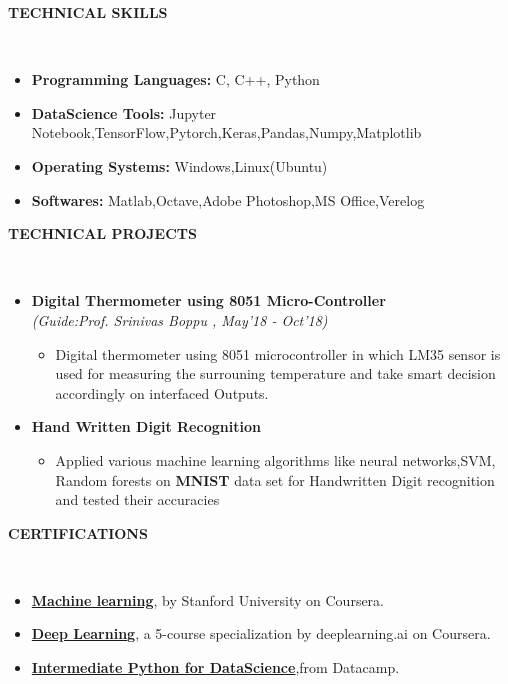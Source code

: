 \documentclass[a4paper,10pt]{article}
\newcommand{\isep}{-2 pt}
\newcommand{\lsep}{-0.5cm}
\newcommand{\resheading}[1]{{\small \colorbox{mygrey}{\begin{minipage}{0.975\textwidth}{\textbf{#1 \vphantom{p\^{E}}}}\end{minipage}}}}
\begin{document}
\resheading{\textbf{TECHNICAL SKILLS} }\\[\lsep]
\begin{itemize}
\item \noindent \textbf{Programming Languages:} C, C++, Python\item \noindent \textbf{DataScience Tools:} Jupyter Notebook,TensorFlow,Pytorch,Keras,Pandas,Numpy,Matplotlib 
\item \noindent \textbf{Operating Systems:} Windows,Linux(Ubuntu)
\item \noindent \textbf{Softwares:} Matlab,Octave,Adobe Photoshop,MS Office,Verelog  
\end{itemize}

\resheading{\textbf{TECHNICAL PROJECTS} }\\[\lsep]
\begin{itemize}
\item \textbf{Digital Thermometer using 8051 Micro-Controller
}\\
 \emph{(Guide:Prof. Srinivas Boppu
, May'18 - Oct'18)} \\[-0.6cm]
	\begin{itemize}\itemsep \isep
	\item Digital thermometer using 8051 microcontroller in which LM35 sensor is used for measuring the surrouning temperature and take smart decision accordingly on interfaced Outputs.
	\end{itemize}

\item \textbf{Hand Written Digit Recognition} \\[\lsep]

	\begin{itemize}\itemsep \isep
	\item Applied various machine learning algorithms like neural networks,SVM, Random forests on \textbf{MNIST} data set for Handwritten Digit recognition and tested their accuracies
	\end{itemize}
\end{itemize}

\resheading{\textbf{CERTIFICATIONS} }\\[\lsep]
\begin{itemize}
\item \noindent \href{https://www.coursera.org/account/accomplishments/certificate/85J7R7652ZPA}{\textbf{Machine learning}}, by Stanford University on Coursera.
\item \noindent \href{https://www.coursera.org/account/accomplishments/specialization/certificate/DJNS8SYSQLUW}{\textbf{Deep Learning}}, a 5-course specialization by deeplearning.ai on Coursera.
\item \noindent \href{https://www.datacamp.com/statement-of-accomplishment/course/8e025414725f512e2b0fd5692a1c4d5c18fdaec7}{\textbf{Intermediate Python for DataScience}},from Datacamp.

\end{itemize}
\end{document}

